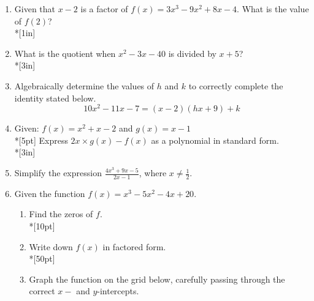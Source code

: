 \documentclass[12pt, oneside]{article}
\begin{document}
\begin{enumerate}
\newpage

\item Given that $x-2$ is a factor of $f(x)=3x^3-9x^2+8x-4$. What is the value of $f(2)$? \\*[1in]

\item What is the quotient when $x^2-3x-40$ is divided by $x + 5$?\\*[3in]

\item Algebraically determine the values of $h$ and $k$ to correctly complete the identity stated below.
\[10x^2-11x-7=(x-2)(hx+9)+k\] %

\newpage

\item Given: $f(x)=x^2+ x - 2$ and $g(x)=x-1$\\*[5pt]
Express $2x \times g(x) - f(x)$ as a polynomial in standard form. \\*[3in]


\item Simplify the expression $\displaystyle \frac{4x^3+9x-5}{2x-1}$, where $x \neq \frac{1}{2}$. 

\newpage

\item Given the function $f(x)=x^3-5x^2-4x+20$. 
\begin{enumerate}
    \item Find the zeros of $f$.\\*[10pt]
    \item Write down $f(x)$ in factored form.\\*[50pt]
    \item Graph the function on the grid below, carefully passing through the correct $x-$ and $y$-intercepts. 
\end{enumerate}
\begin{center}
\end{center}


\end{enumerate}
\end{document}
